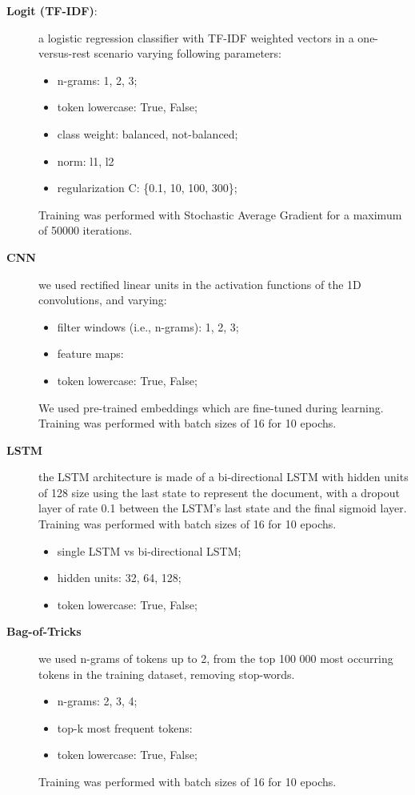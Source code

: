 \documentclass[11pt,a4paper]{article}
\begin{document}
\begin{description}

\item[\textbf{Logit (TF-IDF)}:] a logistic regression classifier with TF-IDF
weighted vectors in a one-versus-rest scenario varying following parameters:

\begin{itemize}
\item n-grams: 1, 2, 3;
\item token lowercase: True, False;
\item class weight: balanced, not-balanced;
\item norm: l1, l2
\item regularization C: \{0.1, 10, 100, 300\};
\end{itemize}

Training was performed with Stochastic Average Gradient for a maximum of 50000 iterations.

\item[\textbf{CNN}] we used rectified linear units in the activation functions
of the 1D convolutions, and varying:

\begin{itemize}
\item filter windows (i.e., n-grams): 1, 2, 3;
\item feature maps:
\item token lowercase: True, False;
\end{itemize}

We used pre-trained embeddings which are fine-tuned during learning. Training was
performed with batch sizes of 16 for 10 epochs.

\item[\textbf{LSTM}] the LSTM architecture is made of a bi-directional LSTM with
hidden units of 128 size using the last state to represent the document, with a
dropout layer of rate 0.1 between the LSTM's last state and the final
sigmoid layer. Training was performed with batch sizes of 16 for 10 epochs.

\begin{itemize}
\item single LSTM vs bi-directional LSTM;
\item hidden units: 32, 64, 128;
\item token lowercase: True, False;
\end{itemize}

\item[\textbf{Bag-of-Tricks}] we used n-grams of tokens up to 2, from the top 100 000
most occurring tokens in the training dataset, removing stop-words.

\begin{itemize}
\item n-grams: 2, 3, 4;
\item top-k most frequent tokens:
\item token lowercase: True, False;
\end{itemize}

Training was performed with batch sizes of 16 for 10 epochs.

\end{description}
\end{document}
